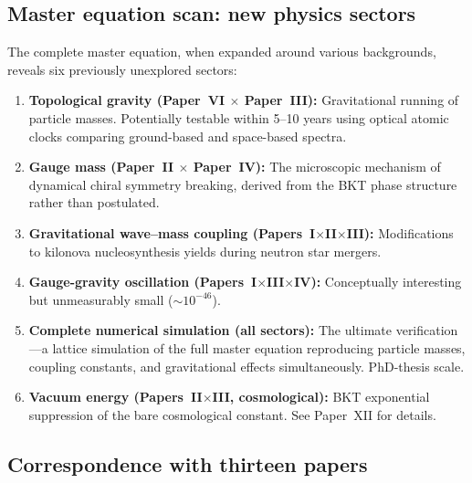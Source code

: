 \documentclass[twocolumn,preprintnumbers,amsmath,amssymb,prd]{revtex4-2}
\begin{document}
\subsection{Master equation scan: new physics sectors}

The complete master equation, when expanded around various backgrounds, reveals six previously unexplored sectors:

\begin{enumerate}
\item \textbf{Topological gravity (Paper~VI $\times$ Paper~III):} Gravitational running of particle masses. Potentially testable within 5--10 years using optical atomic clocks comparing ground-based and space-based spectra.

\item \textbf{Gauge mass (Paper~II $\times$ Paper~IV):} The microscopic mechanism of dynamical chiral symmetry breaking, derived from the BKT phase structure rather than postulated.

\item \textbf{Gravitational wave--mass coupling (Papers~I$\times$II$\times$III):} Modifications to kilonova nucleosynthesis yields during neutron star mergers.

\item \textbf{Gauge-gravity oscillation (Papers~I$\times$III$\times$IV):} Conceptually interesting but unmeasurably small ($\sim 10^{-46}$).

\item \textbf{Complete numerical simulation (all sectors):} The ultimate verification---a lattice simulation of the full master equation reproducing particle masses, coupling constants, and gravitational effects simultaneously. PhD-thesis scale.

\item \textbf{Vacuum energy (Papers~II$\times$III, cosmological):} BKT exponential suppression of the bare cosmological constant. See Paper~XII for details.
\end{enumerate}

\subsection{Correspondence with thirteen papers}
\end{document}
